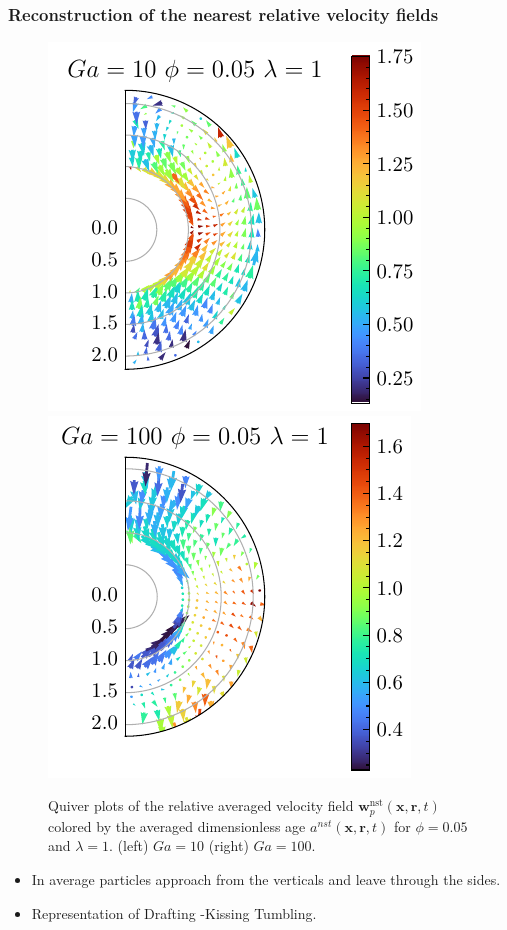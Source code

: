 \documentclass{sintefbeamer}
\begin{document}
\begin{frame}
  \frametitle{Reconstruction of the nearest relative velocity fields}

  \begin{figure}[h!]
    \centering
    \includegraphics[height=0.35\textwidth]{image/HOMOGENEOUS_NEW/Dist/U_rel_l_1_Ga_10_PHI_5.pdf}
    \includegraphics[height=0.35\textwidth]{image/HOMOGENEOUS_NEW/Dist/U_rel_l_1_Ga_100_PHI_5.pdf}
    \caption{
         Quiver plots of the relative averaged velocity field $\textbf{w}^\text{nst}_p(\textbf{x},\textbf{r},t)$ colored by the averaged dimensionless age $a^{nst}(\textbf{x},\textbf{r},t)$ for $\phi = 0.05$ and $\lambda = 1$.
         (left) $Ga = 10$ (right) $Ga =100$. }
    \label{fig:Why_Ga_matter}
\end{figure}

\begin{itemize}
  \item In average particles approach from the verticals and leave through the sides. 
  \item Representation of Drafting -Kissing Tumbling. 
\end{itemize}
\end{frame}
\end{document}
